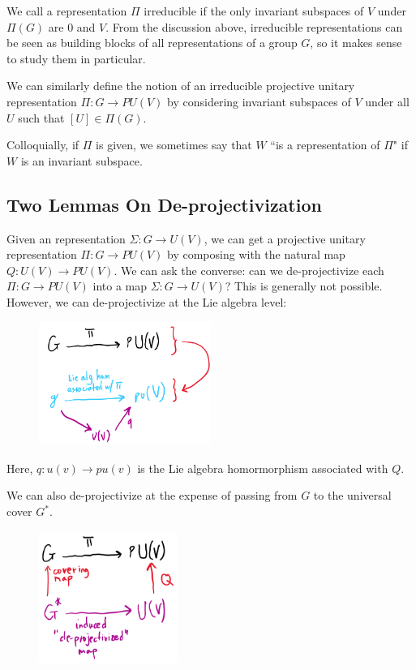 We call a representation $\Pi$ irreducible if the only invariant subspaces of $V$ under $\Pi(G)$ are 0 and $V$. From the discussion above, irreducible representations can be seen as building blocks of all representations of a group $G$, so it makes sense to study them in particular.

We can similarly define the notion of an irreducible projective unitary representation $\Pi: G \rightarrow PU(V)$ by considering invariant subspaces of $V$ under all $U$ such that $[U] \in \Pi(G)$.

Colloquially, if $\Pi$ is given, we sometimes say that $W$ ``is a representation of $\Pi$" if $W$ is an invariant subspace.

\subsection{Two Lemmas On De-projectivization}
Given an representation $\Sigma: G \rightarrow U(V)$, we can get a projective unitary representation $\Pi: G \rightarrow PU(V)$ by composing with the natural map $Q: U(V) \rightarrow PU(V)$. We can ask the converse: can we de-projectivize each $\Pi: G \rightarrow PU(V)$ into a map $\Sigma: G \rightarrow U(V)$? This is generally not possible. However, we can de-projectivize at the Lie algebra level:
\begin{figure}[H]
    \includegraphics[width=0.5\textwidth]{figures/de-projectivization}
    \centering
\end{figure}

Here, $q: u(v) \rightarrow pu(v)$ is the Lie algebra homormorphism associated with $Q$.

We can also de-projectivize at the expense of passing from $G$ to the universal cover $G^*$.
\begin{figure}[H]
    \includegraphics[width=0.4\textwidth]{figures/de-projectivization2}
    \centering
\end{figure}

